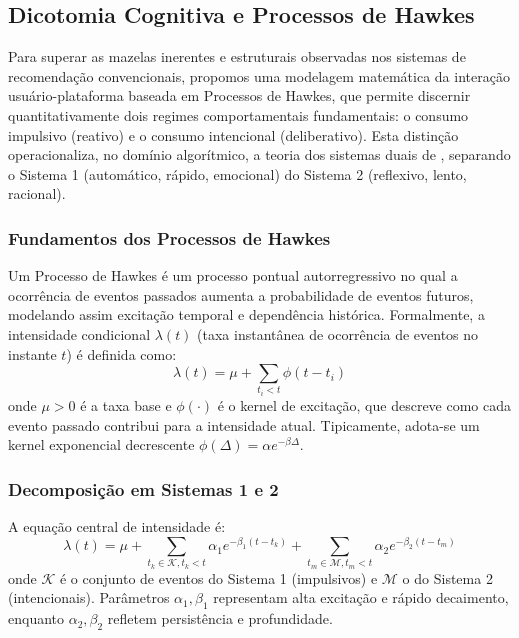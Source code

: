 \documentclass{sbc2023}
\begin{document}
\subsection{Dicotomia Cognitiva e Processos de Hawkes}
Para superar as mazelas inerentes e estruturais observadas nos sistemas de recomendação convencionais, propomos uma modelagem matemática da interação usuário-plataforma baseada em Processos de Hawkes, que permite discernir quantitativamente dois regimes comportamentais fundamentais: o consumo impulsivo (reativo) e o consumo intencional (deliberativo). Esta distinção operacionaliza, no domínio algorítmico, a teoria dos sistemas duais de \citet{kahneman2011}, separando o Sistema 1 (automático, rápido, emocional) do Sistema 2 (reflexivo, lento, racional).

\subsubsection{Fundamentos dos Processos de Hawkes}
Um Processo de Hawkes é um processo pontual autorregressivo no qual a ocorrência de eventos passados aumenta a probabilidade de eventos futuros, modelando assim excitação temporal e dependência histórica. Formalmente, a intensidade condicional $\lambda(t)$ (taxa instantânea de ocorrência de eventos no instante $t$) é definida como:
\begin{equation}
\lambda(t) = \mu + \sum_{t_i<t} \phi(t - t_i)
\end{equation}
onde $\mu > 0$ é a taxa base e $\phi(\cdot)$ é o kernel de excitação, que descreve como cada evento passado contribui para a intensidade atual. Tipicamente, adota-se um kernel exponencial decrescente $\phi(\Delta) = \alpha e^{-\beta \Delta}$.

\subsubsection{Decomposição em Sistemas 1 e 2}
A equação central de intensidade é:
\begin{equation} \label{eq:hawkes}
\lambda(t) = \mu + \sum_{t_k \in \mathcal{K}, t_k < t} \alpha_1 e^{-\beta_1(t-t_k)} + \sum_{t_m \in \mathcal{M}, t_m < t} \alpha_2 e^{-\beta_2(t-t_m)}
\end{equation}
onde $\mathcal{K}$ é o conjunto de eventos do Sistema 1 (impulsivos) e $\mathcal{M}$ o do Sistema 2 (intencionais). Parâmetros $\alpha_1, \beta_1$ representam alta excitação e rápido decaimento, enquanto $\alpha_2, \beta_2$ refletem persistência e profundidade.
\end{document}
